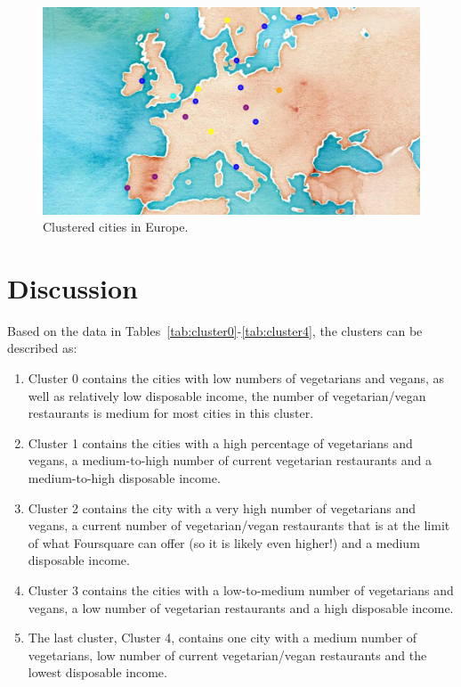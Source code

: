\documentclass[12pt,a4paper]{article}
\begin{document}
\begin{table}[htbp!]
	\centering
	\caption{Cities in cluster 4}
	\label{tab:cluster4}
\end{table}

\begin{figure}
	\includegraphics[width=\linewidth]{clusteredCities}
	\caption{Clustered cities in Europe. }
	\label{fig:clusteredCities}
\end{figure}

\newpage
\section{Discussion}
\label{sec:discussion}
Based on the data in Tables~\ref{tab:cluster0}-\ref{tab:cluster4}, the clusters can be described as:
\begin{enumerate}
	\item Cluster 0 contains the cities with low numbers of vegetarians and vegans, as well as relatively low disposable income, the number of vegetarian/vegan restaurants is medium for most cities in this cluster.
	\item Cluster 1 contains the cities with a high percentage of vegetarians and vegans, a medium-to-high number of current vegetarian restaurants and a medium-to-high disposable income.
	\item Cluster 2 contains the city with a very high number of vegetarians and vegans, a current number of vegetarian/vegan restaurants that is at the limit of what Foursquare can offer (so it is likely even higher!) and a medium disposable income.
	\item Cluster 3 contains the cities with a low-to-medium number of vegetarians and vegans, a low number of vegetarian restaurants and a high disposable income.
	\item The last cluster, Cluster 4, contains one city with a medium number of vegetarians, low number of current vegetarian/vegan restaurants and the lowest disposable income.
\end{enumerate}
\end{document}
